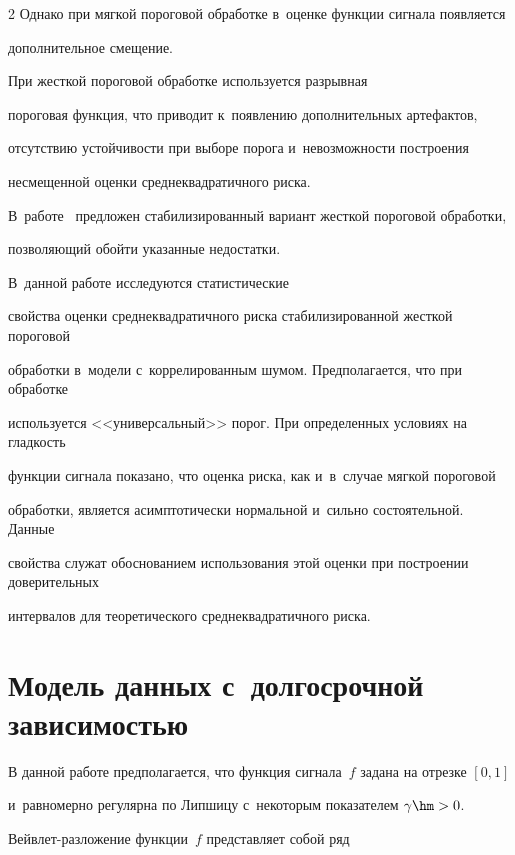 \begin{multicols}{2}
Однако при мягкой пороговой обработке в~оценке функции сигнала появляется 

дополнительное смещение. 



При жесткой пороговой обработке используется разрывная 

пороговая функция, что приводит к~появлению дополнительных артефактов, 

отсутствию устой\-чи\-вости при выборе порога и~не\-воз\-мож\-ности по\-стро\-ения 

несмещенной оценки сред\-не\-квад\-ра\-тич\-но\-го риска. 

В~работе~\cite{HL10} предложен стабилизированный вариант жесткой пороговой обработки, 

позволяющий обойти указанные недостатки. 



В~данной работе исследуются статистические 

свойства оценки сред\-не\-квад\-ра\-тич\-но\-го рис\-ка стабилизированной жест\-кой пороговой 

обработки в~модели с~коррелированным шумом. Предполагается, что при обработке 

используется <<универсальный>> порог. При определенных условиях на глад\-кость 

функции сигнала показано, что оценка рис\-ка, как и~в~случае мяг\-кой пороговой 

обработки, является асимп\-то\-ти\-чески нормальной и~сильно со\-сто\-ятель\-ной. Данные 

свойства служат обоснованием использования этой оценки при по\-стро\-ении доверительных 

интервалов для тео\-ре\-ти\-че\-ско\-го среднеквадратичного риска.



\section{Модель данных с~долгосрочной зависимостью}



В данной работе предполагается, что функция сигнала~$f$ задана на отрезке $[0,1]$ 

и~равномерно регулярна по Липшицу с~некоторым показателем $\gamma\hm>0$. 

Вейв\-лет-раз\-ло\-же\-ние функции~$f$ пред\-став\-ля\-ет собой ряд

\begin{equation}


\end{equation}
\end{multicols}
